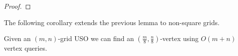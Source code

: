 \documentclass[runningheads,a4paper]{llncs}
\newcommand{\MM}[1]{\marginpar{\parbox{3.6cm}{{\small {\bf MM:} #1}}}} %
\begin{document}
\begin{proof}
\end{proof}

The following corollary extends the previous lemma to non-square grids.

\begin{corollary}[$*$]\label{corollary: n/4 indegree}
  Given an $(m, n)$-grid USO we can find an $(\frac{m}{8}, \frac{n}{8})$-vertex using $O(m+n)$ vertex queries.
\end{corollary} 


\end{document}
